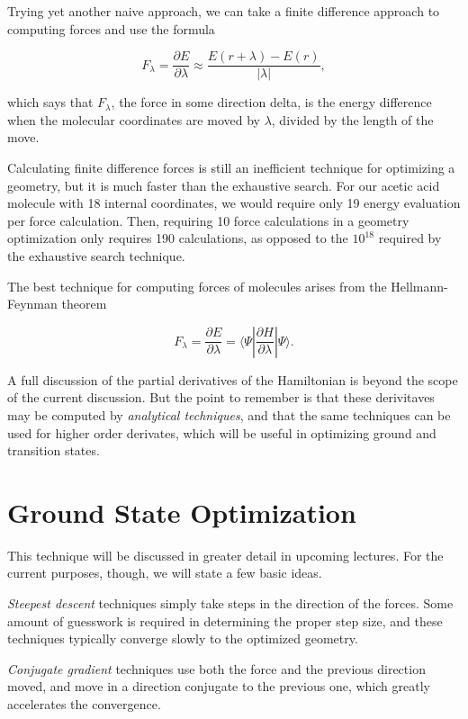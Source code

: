 Trying yet another naive approach, we can take a finite difference
approach to computing forces and use the formula

\begin{equation}
F_\lambda = \frac{\partial E}{\partial\lambda} 
	\approx \frac{E(r+\lambda)-E(r)}{|\lambda|},
\end{equation}

\noindent which says that $F_\lambda$, the force in some direction
delta, is the energy difference when the molecular coordinates are
moved by $\lambda$, divided by the length of the move.

Calculating finite difference forces is still an inefficient technique
for optimizing a geometry, but it is much faster than the exhaustive
search. For our acetic acid molecule with 18 internal coordinates, we
would require only 19 energy evaluation per force calculation. Then,
requiring 10 force calculations in a geometry optimization only
requires 190 calculations, as opposed to the $10^{18}$ required by the
exhaustive search technique.

The best technique for computing forces of molecules arises from the
Hellmann-Feynman theorem

\begin{equation}
F_\lambda = \frac{\partial E}{\partial\lambda} 
	= \langle\Psi|\frac{\partial H}{\partial\lambda}|
	\Psi\rangle.
\end{equation}

\noindent A full discussion of the partial derivatives of the
Hamiltonian is beyond the scope of the current discussion. But the
point to remember is that these derivitaves may be computed by
\emph{analytical techniques}, and that the same techniques can be used
for higher order derivates, which will be useful in optimizing
ground and transition states.

\section{Ground State Optimization}
This technique will be discussed in greater detail in upcoming
lectures. For the current purposes, though, we will state a few basic
ideas. 

\emph{Steepest descent} techniques simply take steps in the direction
of the forces. Some amount of guesswork is required in determining the
proper step size, and these techniques typically converge slowly to
the optimized geometry.

\emph{Conjugate gradient} techniques use both the force and the
previous direction moved, and move in a direction conjugate to the
previous one, which greatly accelerates the convergence.

